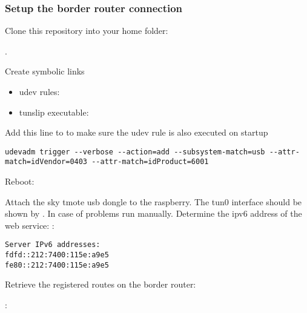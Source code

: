 \subsubsection{Setup the border router connection}\label{setup-the-border-router-connection}

Clone this repository into your home folder:

.

Create symbolic links

\begin{itemize}
	\item{udev rules: }
	\item{tunslip executable:\\
		}
\end{itemize}

Add this line to  to make sure the udev rule is also executed on startup

\noindent
\begin{minipage}{\linewidth}
	\begin{lstlisting}[numbers=none]
udevadm trigger --verbose --action=add --subsystem-match=usb --attr-match=idVendor=0403 --attr-match=idProduct=6001
	\end{lstlisting}
\end{minipage}

Reboot: 

Attach the sky tmote usb dongle to the raspberry. The tun0 interface should be shown by .
In case of problems run 
manually.
Determine the ipv6 address of the web service:
:

\noindent
\begin{minipage}{\linewidth}
	\begin{lstlisting}[numbers=none]
Server IPv6 addresses:
fdfd::212:7400:115e:a9e5
fe80::212:7400:115e:a9e5
	\end{lstlisting}
\end{minipage}

Retrieve the registered routes on the border router:

:

